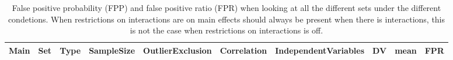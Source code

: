 \begin{longtable}{lllrlrrrrr}
\caption{False positive probability (FPP) and false positive ratio (FPR) when looking at all the different sets under the different condetions. When restrictions on interactions are on main effects should always be present when there is interactions, this is not the case when restrictions on interactions is off.} \\ 
  \hline
Main & Set & Type & SampleSize & OutlierExclusion & Correlation & IndependentVariables & DV & mean & FPR \\ 
  \hline
\hline
\hline
\end{longtable}
